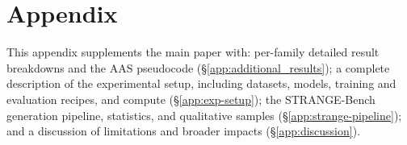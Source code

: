 \section*{Appendix}
\setlength{\intextsep}{4pt plus 1pt minus 1pt}
\setlength{\textfloatsep}{6pt plus 2pt minus 2pt}
\setlength{\floatsep}{6pt plus 2pt minus 2pt}
\raggedbottom
\makeatletter\setlength{\@fptop}{0pt}\setlength{\@fpsep}{6pt plus 2pt minus 2pt}\setlength{\@fpbot}{0pt plus 1fil}\makeatother
\captionsetup{font=small}

This appendix supplements the main paper with: per-family detailed result breakdowns and the AAS pseudocode (\S\ref{app:additional_results}); a complete description of the experimental setup, including datasets, models, training and evaluation recipes, and compute (\S\ref{app:exp-setup}); the STRANGE-Bench generation pipeline, statistics, and qualitative samples (\S\ref{app:strange-pipeline}); and a discussion of limitations and broader impacts (\S\ref{app:discussion}).

